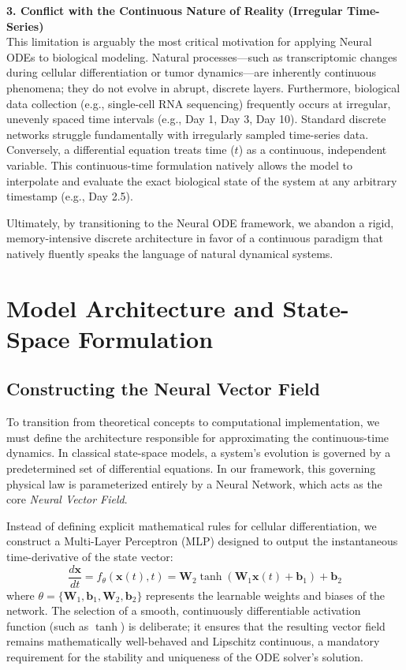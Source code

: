 \documentclass[12pt, a4paper]{article}
\begin{document}
	\vspace{0.3cm}
	\noindent \textbf{3. Conflict with the Continuous Nature of Reality (Irregular Time-Series)} \\
	This limitation is arguably the most critical motivation for applying Neural ODEs to biological modeling. Natural processes—such as transcriptomic changes during cellular differentiation or tumor dynamics—are inherently continuous phenomena; they do not evolve in abrupt, discrete layers. Furthermore, biological data collection (e.g., single-cell RNA sequencing) frequently occurs at irregular, unevenly spaced time intervals (e.g., Day 1, Day 3, Day 10). Standard discrete networks struggle fundamentally with irregularly sampled time-series data. Conversely, a differential equation treats time ($t$) as a continuous, independent variable. This continuous-time formulation natively allows the model to interpolate and evaluate the exact biological state of the system at any arbitrary timestamp (e.g., Day 2.5).
	
	\vspace{0.3cm}
	Ultimately, by transitioning to the Neural ODE framework, we abandon a rigid, memory-intensive discrete architecture in favor of a continuous paradigm that natively fluently speaks the language of natural dynamical systems.
	
	\section{Model Architecture and State-Space Formulation}
	
	\subsection{Constructing the Neural Vector Field}
	To transition from theoretical concepts to computational implementation, we must define the architecture responsible for approximating the continuous-time dynamics. In classical state-space models, a system's evolution is governed by a predetermined set of differential equations. In our framework, this governing physical law is parameterized entirely by a Neural Network, which acts as the core \textit{Neural Vector Field}.
	
	Instead of defining explicit mathematical rules for cellular differentiation, we construct a Multi-Layer Perceptron (MLP) designed to output the instantaneous time-derivative of the state vector:
	$$ \frac{d\mathbf{x}}{dt} = f_{\theta}(\mathbf{x}(t), t) = \mathbf{W}_2 \tanh(\mathbf{W}_1 \mathbf{x}(t) + \mathbf{b}_1) + \mathbf{b}_2 $$
	where $\theta = \{\mathbf{W}_1, \mathbf{b}_1, \mathbf{W}_2, \mathbf{b}_2\}$ represents the learnable weights and biases of the network. The selection of a smooth, continuously differentiable activation function (such as $\tanh$) is deliberate; it ensures that the resulting vector field remains mathematically well-behaved and Lipschitz continuous, a mandatory requirement for the stability and uniqueness of the ODE solver's solution.
	
\end{document}
